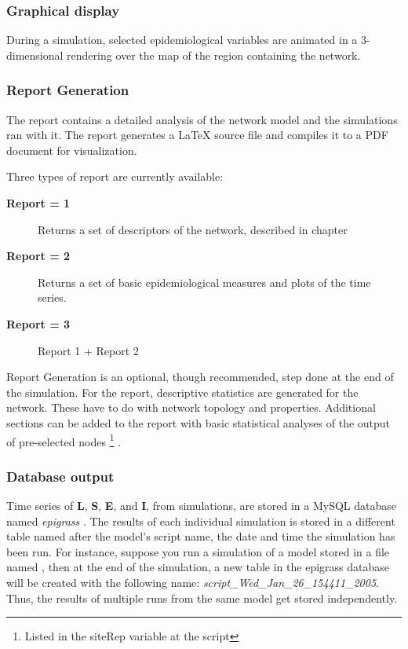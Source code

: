 \documentclass[a4paper,10pt,english]{sphinxmanual}
\begin{document}
\subsubsection{Graphical display}
\label{overview:graphical-display}
During a simulation, selected epidemiological variables are animated in a 3-dimensional rendering over the map of the region containing the network.


\subsubsection{Report Generation}
\label{overview:report-generation}
The report contains a detailed analysis of the network model and the simulations ran with it. The report generates a LaTeX source file and compiles it to a PDF document for visualization.

Three types of report are currently available:
\begin{description}
\item[{\textbf{Report = 1}}] \leavevmode
Returns a set of descriptors of the network, described in chapter

\item[{\textbf{Report = 2}}] \leavevmode
Returns a set of basic epidemiological measures and plots of the time series.

\item[{\textbf{Report = 3}}] \leavevmode
Report 1 + Report 2

\end{description}

Report Generation is an optional, though recommended, step done at the end of the simulation. For the report, descriptive statistics are generated for the network. These have to do with network topology and properties. Additional sections can be added to the report with basic statistical analyses of the output of pre-selected nodes \footnote{
Listed in the siteRep variable at the script
} .


\subsubsection{Database output}
\label{overview:database-output}
Time series of \textbf{L}, \textbf{S}, \textbf{E}, and \textbf{I}, from simulations, are stored in a MySQL database named \emph{epigrass} . The results of each individual simulation is stored in a different table named after the model's script name, the date and time the simulation has been run. For instance, suppose you run a simulation of a model stored in a file named , then at the end of the simulation, a new table in the epigrass database will be created with the following name: \emph{script\_Wed\_Jan\_26\_154411\_2005}. Thus, the results of multiple runs from the same model get stored independently.
\end{document}
